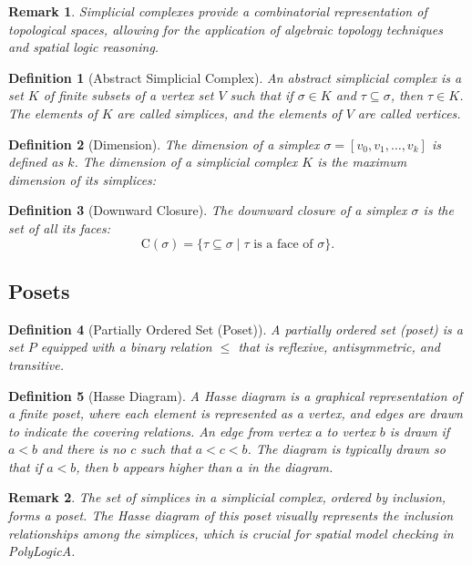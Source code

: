 \documentclass[11pt,a4paper]{article}
\newtheorem{definition}{Definition}
\newtheorem{remark}{Remark}
\begin{document}
\begin{remark}
    Simplicial complexes provide a combinatorial representation of topological spaces, allowing for the application of algebraic topology techniques and spatial logic reasoning.
\end{remark}

\begin{definition} [Abstract Simplicial Complex]
    An abstract simplicial complex is a set $K$ of finite subsets of a vertex set $V$ such that if $\sigma \in K$ and $\tau \subseteq \sigma$, then $\tau \in K$. The elements of $K$ are called simplices, and the elements of $V$ are called vertices.
\end{definition}

\begin{definition} [Dimension]
    The dimension of a simplex $\sigma = \left[v_0, v_1, \ldots, v_k\right]$ is defined as $k$. The dimension of a simplicial complex $K$ is the maximum dimension of its simplices:
\end{definition}

\begin{definition} [Downward Closure]
    The downward closure of a simplex $\sigma$ is the set of all its faces:
    \[
    \text{C}(\sigma) = \{\tau \subseteq \sigma \mid \tau \text{ is a face of } \sigma\}.
    \]
\end{definition}

\subsection{Posets}

\begin{definition} [Partially Ordered Set (Poset)]
    A partially ordered set (poset) is a set $P$ equipped with a binary relation $\leq$ that is reflexive, antisymmetric, and transitive.
\end{definition}

\begin{definition} [Hasse Diagram]
    A Hasse diagram is a graphical representation of a finite poset, where each element is represented as a vertex, and edges are drawn to indicate the covering relations. An edge from vertex $a$ to vertex $b$ is drawn if $a < b$ and there is no $c$ such that $a < c < b$. The diagram is typically drawn so that if $a < b$, then $b$ appears higher than $a$ in the diagram.
\end{definition}

\begin{remark}
    The set of simplices in a simplicial complex, ordered by inclusion, forms a poset. The Hasse diagram of this poset visually represents the inclusion relationships among the simplices, which is crucial for spatial model checking in PolyLogicA.
\end{remark}
\end{document}
